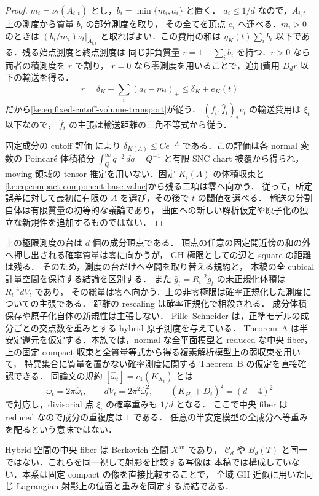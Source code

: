 \begin{proof}
$m_i=\nu_t(A_{i,t})$ とし，$b_i=\min\{m_i,a_i\}$ と置く．
$a_i\le1/d$ なので，$A_{i,t}$ 上の測度から質量 $b_i$ の部分測度を取り，
その全てを頂点 $e_i$ へ運べる．$m_i>0$ のときは
$(b_i/m_i)\nu_t|_{A_{i,t}}$ と取ればよい．この費用の和は
$\eta_K(t)\sum_i b_i$ 以下である．残る始点測度と終点測度は
同じ非負質量 $r=1-\sum_i b_i$ を持つ．$r>0$ なら両者の積測度を $r$ で割り，
$r=0$ なら零測度を用いることで，追加費用 $D_dr$ 以下の輸送を得る．
\[
 r=\delta_K+\sum_i(a_i-m_i)_+
   \le\delta_K+e_K(t)
\]
だから\eqref{ke:eq:fixed-cutoff-volume-transport}が従う．
$(f_t,\widehat f_t)_*\nu_t$ の輸送費用は $\xi_t$ 以下なので，
$\widehat f_t$ の主張は輸送距離の三角不等式から従う．

固定成分の cutoff 評価
\cite[\texttt{cor:CW-fixed-cutoff-budget}]{MultiscaleKECurrent}により
$\delta_{K(A)}\le Ce^{-A}$ である．この評価は各 normal 変数の
Poincar\'e 体積積分 $\int_Q^\infty q^{-2}\,dq=Q^{-1}$ と有限 SNC chart 被覆から得られ，
moving 領域の tensor 推定を用いない．固定 $K_i(A)$ の体積収束と
\eqref{ke:eq:compact-component-base-value}から残る二項は零へ向かう．
従って，所定誤差に対して最初に有限の $A$ を選び，その後で $t$ の閾値を選べる．
輸送の分割自体は有限質量の初等的な議論であり，
曲面への新しい解析仮定や原子化の独立な新規性を追加するものではない．
\end{proof}

\begin{remark}[計量的な台と測度の台]
\label{ke:global-volume-scope}
上の極限測度の台は $d$ 個の成分頂点である．
頂点の任意の固定開近傍の和の外へ押し出される確率質量は零に向かうが，
GH 極限としての辺と square の距離は残る．
そのため，測度の台だけへ空間を取り替える規約と，
本稿の全 cubical 計量空間を保持する結論を区別する．
また $\bar g_t=R_t^{-2}g_t$ の未正規化体積は $R_t^{-4}dV_t$ であり，
その総量は零へ向かう．上の非零極限は確率正規化した測度についての主張である．
距離の rescaling は確率正規化で相殺される．
成分体積保存や原子化自体の新規性は主張しない．
Pille--Schneider\cite[Theorems~A--B; Remark~2.4; Proposition~3.1]{PilleSchneiderHybrid}
は，正準モデルの成分ごとの交点数を重みとする hybrid 原子測度を与えている．
Theorem~A は半安定還元を仮定する．本族では，normal な全平面模型と reduced な中央 fiber，
上の固定 compact 収束と全質量等式から得る複素解析模型上の弱収束を用いて，
特異集合に質量を置かない確率測度に関する Theorem~B の仮定を直接確認できる．
同論文の規約 $[\widehat\omega_t]=c_1(K_{X_t})$ とは
\[
 \omega_t=2\pi\widehat\omega_t,\qquad
 dV_t=2\pi^2\widehat\omega_t^2,\qquad
 (K_{H_i}+D_i)^2=(d-4)^2
\]
で対応し，divisorial 点 $\xi_i$ の確率重みも $1/d$ となる．
ここで中央 fiber は reduced なので成分の重複度は $1$ である．
任意の半安定模型の全成分へ等重みを配るという意味ではない．

Hybrid 空間の中央 fiber は Berkovich 空間 $X^{\mathrm{an}}$ であり，
$\mathcal C_d$ や $B_d(T)$ と同一ではない．これらを同一視して射影を比較する写像は
本稿では構成していない．本系は固定 compact の像を直接比較することで，
全域 GH 近似に用いた同じ Lagrangian 射影上の位置と重みを同定する帰結である．
\end{remark}

